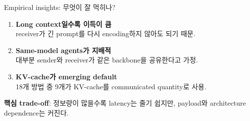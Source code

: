 \documentclass[
11pt,notheorems,hyperref={pdfauthor=whatever}
]{beamer}
\begin{document}
\begin{frame}[t]{Empirical insights: 무엇이 잘 먹히나?}
\vspace{2.4em}
\Large
\begin{center}
\begin{minipage}{0.86\linewidth}
\begin{enumerate}
  \item \textbf{\textcolor{DeepBlue}{Long context일수록 이득이 큼}}\\
  \normalsize receiver가 긴 prompt를 다시 encoding하지 않아도 되기 때문.

  \vspace{1.0em}
  \Large
  \item \textbf{\textcolor{DeepBlue}{Same-model agents가 지배적}}\\
  \normalsize 대부분 sender와 receiver가 같은 backbone을 공유한다고 가정.

  \vspace{1.0em}
  \Large
  \item \textbf{\textcolor{DeepBlue}{KV-cache가 emerging default}}\\
  \normalsize 18개 방법 중 9개가 KV-cache를 communicated quantity로 사용.
\end{enumerate}

\vspace{1.0em}
\large
\textbf{\textcolor{WarnRed}{핵심 trade-off}}:
정보량이 많을수록 latency는 줄기 쉽지만,
payload와 architecture dependence는 커진다.
\end{minipage}
\end{center}
\end{frame}
\end{document}
